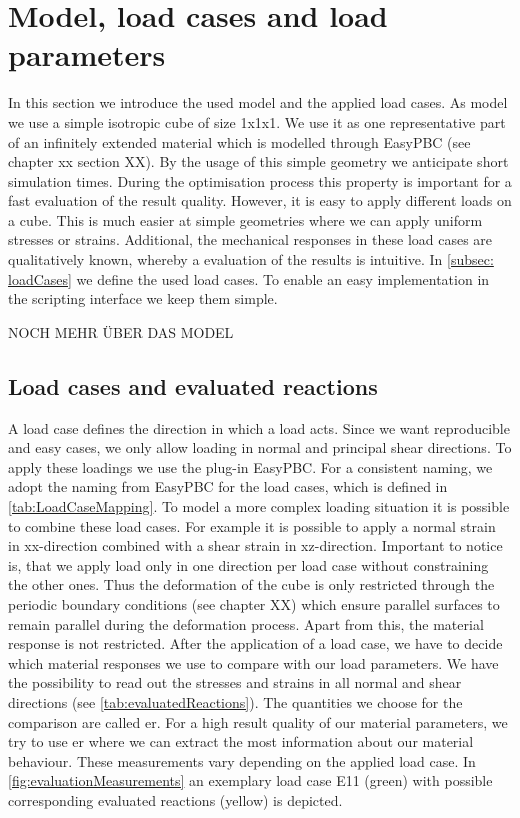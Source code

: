     \section{Model, load cases and load parameters}
    In this section we introduce the used model and the applied load cases. 
    As model we use a simple isotropic cube of size 1x1x1. We use it as one representative part of an infinitely extended material which is modelled through EasyPBC (see chapter xx section XX). By the usage of this simple geometry we anticipate short simulation times. During the optimisation process this property is important for a fast evaluation of the result quality.  However, it is easy to apply different loads on a cube. This is much easier at simple geometries where we can apply uniform stresses or strains. Additional, the mechanical responses in these load cases are qualitatively known, whereby a evaluation of the results is intuitive.
    In \autoref{subsec: loadCases} we define the used load cases. To enable an easy implementation in the  scripting interface we keep them simple. 
    
    
    NOCH MEHR ÜBER DAS MODEL
    
    \subsection{Load cases and evaluated reactions}\label{subsec: loadCases}
    
    A load case defines the direction in which a load acts. Since we want reproducible and easy cases, we only allow loading in normal and principal shear directions. To apply these loadings we use the  plug-in EasyPBC. For a consistent naming, we adopt the naming from EasyPBC for the load cases, which is defined in \autoref{tab:LoadCaseMapping}.
     To model a more complex loading situation it is possible to combine these load cases. For example it is possible to apply a normal strain in xx-direction combined with a shear strain in xz-direction. Important to notice is, that we apply load only in one direction per load case without constraining the other ones. Thus the deformation of the cube is only restricted through the periodic boundary conditions (see chapter XX) which ensure parallel surfaces to remain parallel during the deformation process. Apart from this, the material response is not restricted. After the application of a load case, we have to decide which material responses we use to compare with our load parameters. We have the possibility to read out the stresses and strains in all normal and shear directions (see \autoref{tab:evaluatedReactions}). The quantities we choose for the comparison are called \acrlong{er}.
     For a high result quality of our material parameters, we try to use \acrlong{er} where we can extract the most information about our material behaviour. These measurements vary depending on the applied load case. In \autoref{fig:evaluationMeasurements} an exemplary load case E11 (green) with possible corresponding evaluated reactions (yellow) is depicted.

